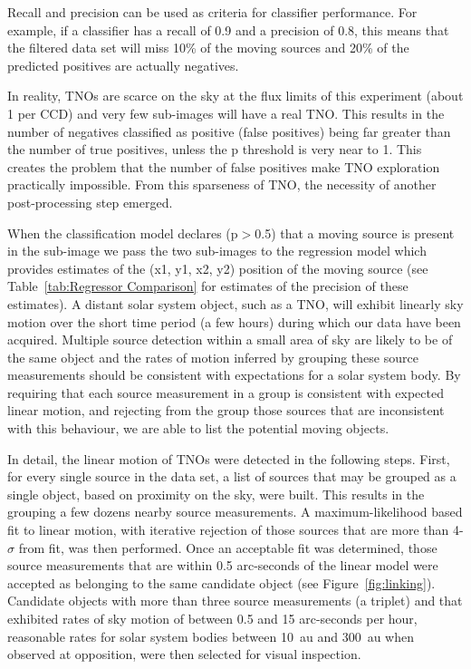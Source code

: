 \documentclass{aastex631}
\begin{document}
Recall and precision can be used as criteria for classifier performance.
For example, if a classifier has a recall of 0.9 and a precision of 0.8, this means that the filtered data set will miss 10\% of the moving sources and 20\% of the predicted positives are actually negatives.

In reality, TNOs are scarce on the sky at the flux limits of this experiment (about 1 per CCD) and very few sub-images will have a real TNO. 
This results in the number of negatives classified as positive (false positives) being far greater than the number of true positives, unless the p threshold is very near to 1. 
This creates the problem that the number of false positives make TNO exploration practically impossible. 
From this sparseness of TNO, the necessity of another post-processing step emerged.

When the classification model declares (p$>$0.5) that a moving source is present in the sub-image we pass the two sub-images to the regression model which provides estimates of the (x1, y1, x2, y2) position of the moving source (see Table~\ref{tab:Regressor Comparison} for estimates of the precision of these estimates).
A distant solar system object, such as a TNO, will exhibit linearly sky motion over the short time period (a few hours) during which our data have been acquired. 
Multiple source detection within a small area of sky are likely to be of the same object and the rates of motion inferred by grouping these source measurements should be consistent with expectations for a solar system body. 
By requiring that each source measurement in a group is consistent with expected linear motion, and rejecting from the group those sources that are inconsistent with this behaviour, we are able to list the potential moving objects.

In detail, the linear motion of TNOs were detected in the following steps.
First, for every single source in the data set, a list of sources that may be grouped as a single object, based on proximity on the sky, were built.
This results in the grouping a few dozens nearby source measurements.
A maximum-likelihood based fit to linear motion, with iterative rejection of those sources that are more than 4-$\sigma$ from fit, was then performed.
Once an acceptable fit was determined, those source measurements that are within 0.5 arc-seconds of the linear model were accepted as belonging to the same candidate object (see Figure~\ref{fig:linking}).
Candidate objects with more than three source measurements (a triplet) and that exhibited rates of sky motion of between 0.5 and 15 arc-seconds per hour, reasonable rates for solar system bodies between 10~au and 300~au when observed at opposition, were then selected for visual inspection.
\end{document}

